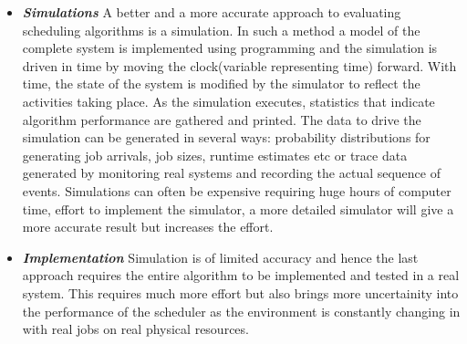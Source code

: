 \begin{itemize}
\item \textbf{\textit{Simulations}} A better and a more accurate approach to evaluating scheduling algorithms is a simulation. In such a method a model of the complete system is implemented using programming and the simulation is driven in time by moving the clock(variable representing time) forward. With time, the state of the system is modified by the simulator to reflect the activities taking place. As the simulation executes, statistics that indicate algorithm performance are gathered and printed. The data to drive the simulation can be generated in several ways: probability distributions for generating job arrivals, job sizes, runtime estimates etc or trace data generated by monitoring real systems and recording the actual sequence of events. Simulations can often be expensive requiring huge hours of computer time, effort to implement the simulator, a more detailed simulator will give a more accurate result but increases the effort.
\item \textbf{\textit{Implementation}} Simulation is of limited accuracy and hence the last approach requires the entire algorithm to be implemented and tested in a real system. This requires much more effort but also brings more uncertainity into the performance of the scheduler as the environment is constantly changing in with real jobs on real physical resources.
\end{itemize}
